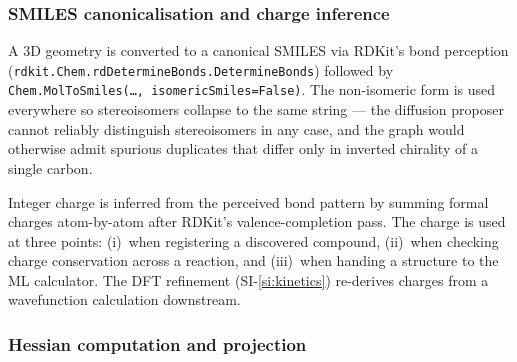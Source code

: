 \subsubsection{SMILES canonicalisation and charge inference}
\label{sec:shared-smiles}

A 3D geometry is converted to a canonical SMILES via RDKit's bond perception (\texttt{rdkit.Chem.rdDetermineBonds.DetermineBonds}) followed by \texttt{Chem.MolToSmiles(\dots, isomericSmiles=False)}. The non-isomeric form is used everywhere so stereoisomers collapse to the same string --- the diffusion proposer cannot reliably distinguish stereoisomers in any case, and the graph would otherwise admit spurious duplicates that differ only in inverted chirality of a single carbon.

Integer charge is inferred from the perceived bond pattern by summing formal charges atom-by-atom after RDKit's valence-completion pass. The charge is used at three points: (i)~when registering a discovered compound, (ii)~when checking charge conservation across a reaction, and (iii)~when handing a structure to the ML calculator. The DFT refinement (SI-\ref{si:kinetics}) re-derives charges from a wavefunction calculation downstream.


\subsubsection{Hessian computation and projection}
\label{sec:shared-hessian}

